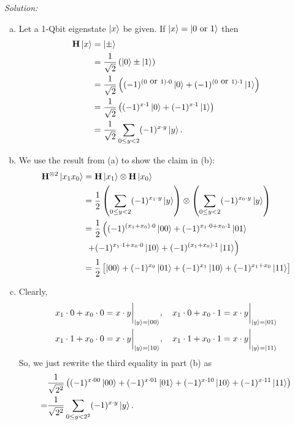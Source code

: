 \documentclass{book}
\theoremstyle{definition}
\newcommand{\nn}{\nonumber}
\newcommand{\f}[2]{\frac{#1}{#2}}
\newcommand{\lp}{\left(}
\newcommand{\rp}{\right)}
\newcommand{\lb}{\left[}
\newcommand{\rb}{\right]}
\newcommand{\had}{\mathbf{H}}
\begin{document}
\noindent \textit{Solution:}

\begin{enumerate}[(a)]
	\item Let a 1-Qbit eigenstate $\ket{x}$ be given. If $\ket{x} = \ket{0\mbox{ or }1}$ then 
	\begin{align}
	\had\ket{x} &= \ket{\pm}\nn\\
	&= \f{1}{\sqrt{2}}\lp \ket{0} \pm \ket{1} \rp\nn\\
	&= \f{1}{\sqrt{2}}\lp (-1)^{(0\mbox{ or }1)\cdot 0}\ket{0} + (-1)^{(0\mbox{ or }1)\cdot 1}\ket{1} \rp\nn\\
	&= \f{1}{\sqrt{2}}\lp (-1)^{x\cdot 1}\ket{0} + (-1)^{x\cdot 1}\ket{1} \rp \nn\\
	&= \f{1}{\sqrt{2}}\sum_{0\leq y < 2}(-1)^{x\cdot y}\ket{y}.
	\end{align}
	\item We use the result from (a) to show the claim in (b):
	\begin{align}
	\had^{\otimes 2}\ket{x_1x_0} &= \had\ket{x_1}\otimes \had\ket{x_0}\nn\\
	&= \f{1}{2}\lp \sum_{0\leq y < 2}(-1)^{x_1\cdot y}\ket{y} \rp \otimes \lp \sum_{0\leq y < 2}(-1)^{x_0\cdot y}\ket{y} \rp\nn\\
	&= \f{1}{2} \lp (-1)^{(x_1+x_0)\cdot 0}\ket{00} + (-1)^{x_1\cdot 0+ x_0\cdot 1} \ket{01} \right.\nn\\
	&\,\,\left.+ (-1)^{x_1\cdot 1 + x_0\cdot 0}\ket{10} + (-1)^{(x_1+x_0)\cdot 1}\ket{11} \rp\\
	&= \frac{1}{2}\lb \ket{00} + (-1)^{x_0}\ket{01} + (-1)^{x_1}\ket{10} + (-1)^{x_1+x_0}\ket{11} \rb
	\end{align}
	\item Clearly,
	\begin{align}
	&x_1\cdot 0 + x_0 \cdot 0 = x\cdot y\bigg\vert_{\ket{y} = \ket{00}},\quad x_1\cdot 0 + x_0 \cdot 1 = x\cdot y\bigg\vert_{\ket{y} = \ket{01}}\nn\\
	&x_1\cdot 1 + x_0 \cdot 0 = x\cdot y\bigg\vert_{\ket{y} = \ket{10}},\quad x_1\cdot 1 + x_0 \cdot 1 = x\cdot y\bigg\vert_{\ket{y} = \ket{11}}
	\end{align}
	So, we just rewrite the third equality in part (b) as
	\begin{align}
	&\f{1}{\sqrt{2^2}}   \lp (-1)^{x\cdot 00} \ket{00} + (-1)^{x\cdot 01} \ket{01} + (-1)^{x\cdot 10} \ket{10} + (-1)^{x\cdot 11} \ket{11}  \rp\nn\\
	=& \f{1}{\sqrt{2^2}}\sum_{0\leq y< 2^2}(-1)^{x\cdot y}\ket{y}.
	\end{align}
	

\end{enumerate}
\end{document}
